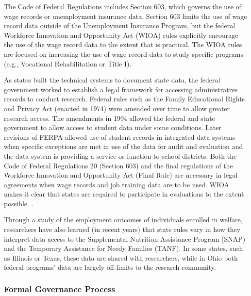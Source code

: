 The Code of Federal Regulations includes Section 603, which governs the use of wage records or unemployment insurance data. Section 603 limits the use of wage record data outside of the Unemployment Insurance Program, but the federal Workforce Innovation and Opportunity Act (WIOA) rules explicitly encourage the use of the wage record data to the extent that is practical. The WIOA rules are focused on increasing the use of wage record data to study specific programs (e.g., Vocational Rehabilitation or Title I).

As states built the technical systems to document state data, the federal government worked to establish a legal framework for accessing administrative records to conduct research. Federal rules such as the Family Educational Rights and Privacy Act (enacted in 1974) were amended over time to allow greater research access. The amendments in 1994 allowed the federal and state government to allow access to student data under some conditions. Later revisions of FERPA allowed use of student records in integrated data systems when specific exceptions are met in use of the data for audit and evaluation and the data system is providing a service or function to school districts. Both the Code of Federal Regulations 20 (Section 603) and the final regulations of the Workforce Innovation and Opportunity Act (Final Rule) are necessary in legal agreements when wage records and job training data are to be used. WIOA makes it clear that states are required to participate in evaluations to the extent possible. \citep{officeofthefederalregister2016a}.

Through a study of the employment outcomes of individuals enrolled in welfare, researchers have also learned (in recent years) that state rules vary in how they interpret data access to the Supplemental Nutrition Assistance Program (SNAP) and the Temporary Assistance for Needy Families (TANF). In some states, such as Illinois or Texas, these data are shared with researchers, while in Ohio both federal programs' data are largely off-limits to the research community.



\hypertarget{formal-governance-process}{%
\subsubsection*{Formal Governance Process}\label{formal-governance-process}}

